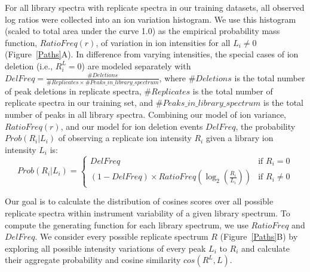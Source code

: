 \documentclass[endnotes,11pt]{article}
\begin{document}
For all library spectra with replicate spectra in our training datasets, all observed log ratios were collected into an ion variation histogram. We use this histogram (scaled to total area under the curve 1.0) as the empirical probability mass function, $RatioFreq(r)$, of variation in ion intensities for all $L_i \neq 0$ (Figure~\ref{Paths}A). In difference from varying intensities, the special cases of ion deletion (i.e., $R_i^L = 0$) are modeled separately with $DelFreq = \frac{\#Deletions}{\#Replicates \times \#Peaks\_in\_library\_spectrum}$, where $\#Deletions$ is the total number of peak deletions in replicate spectra, $\#Replicates$ is the total number of replicate spectra in our training set, and $\#Peaks\_in\_library\_spectrum$ is the total number of peaks in all library spectra. Combining our model of ion variance, $RatioFreq(r)$, and our model for ion deletion events $DelFreq$, the probability $Prob( R_i | L_i)$ of observing a replicate ion intensity $R_i$ given a library ion intensity $L_i$ is:
$$
Prob( R_i | L_i) =
        \left\{ \begin{array}{ll}
            DelFreq & \mbox{if\ } R_i = 0\\
            (1-DelFreq)\times RatioFreq( \log_2( \frac{ R_i }{ L_i }  )) & \mbox{if\ } R_i\neq 0
        \end{array}
        \right.
$$




Our goal is to calculate the distribution of cosines scores over all possible replicate spectra within instrument variability of a given library spectrum. To compute the generating function for each library spectrum, we use $RatioFreq$ and $DelFreq$. We consider every possible replicate spectrum $R$ (Figure~\ref{Paths}B) by exploring all possible intensity variations of every peak $L_i$ to $R_i$ and calculate their aggregate probability and cosine similarity $cos(R^L, L)$.
\end{document}

